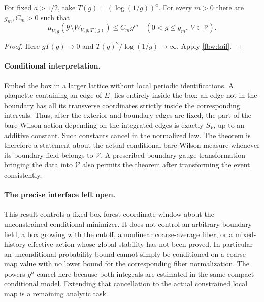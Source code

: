 \begin{corollary}
\label{fbw:logwindow}
For fixed \(a>1/2\), take \(T(g)=(\log(1/g))^a\). For every
\(m>0\) there are \(g_m,C_m>0\) such that
\[
 \mu_{V,g}(\mathcal Y\setminus W_{V,g,T(g)})\leq C_m g^m
 \quad(0<g\leq g_m,\ V\in\mathcal V).
\]
\end{corollary}
\begin{proof}
Here \(gT(g)\to0\) and \(T(g)^2/\log(1/g)\to\infty\).
Apply \eqref{fbw:tail}.
\end{proof}

\paragraph{Conditional interpretation.}
Embed the box in a larger lattice without local periodic
identifications. A plaquette containing an edge of \(E_\circ\)
lies entirely inside the box: an edge not in the boundary has all
its transverse coordinates strictly inside the corresponding
intervals. Thus, after the exterior and boundary edges are fixed,
the part of the bare Wilson action depending on the integrated edges
is exactly \(S_V\), up to an additive constant. Such constants cancel
in the normalized law. The theorem is therefore a statement about
the actual conditional bare Wilson measure whenever its boundary
field belongs to \(\mathcal V\). A prescribed boundary gauge
transformation bringing the data into \(\mathcal V\) also permits
the theorem after transforming the event consistently.

\paragraph{The precise interface left open.}
This result controls a fixed-box forest-coordinate window about
the unconstrained conditional minimizer. It does not control an
arbitrary boundary field, a box growing with the cutoff, a
nonlinear coarse-average fiber, or a mixed-history effective action
whose global stability has not been proved. In particular an
unconditional probability bound cannot simply be conditioned on a
coarse-map value with no lower bound for the corresponding fiber
normalization. The powers \(g^n\) cancel here because both integrals
are estimated in the same compact conditional model. Extending
that cancellation to the actual constrained local map is a
remaining analytic task.
